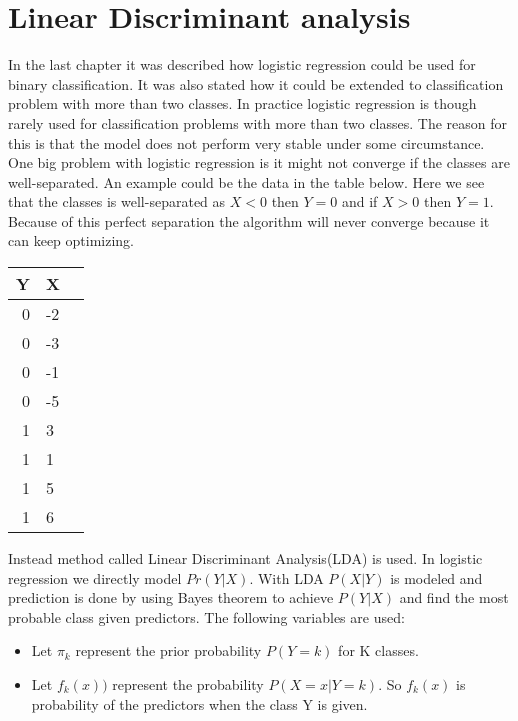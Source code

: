\chapter{Linear Discriminant analysis}
\label{chp:lindisana}

In the last chapter it was described how logistic regression could be used for binary classification. It was also stated how it could be extended to  classification problem with more than two classes. In practice logistic regression is though rarely used for classification problems with more than two classes. The reason for this is that the model does not perform very stable under some circumstance. One big problem with logistic regression is it might not converge if the classes are well-separated. An example could be the data in the table below. Here we see that the classes is well-separated as $X<0$ then $Y=0$ and if $X>0$ then $Y=1$. Because of this perfect separation the algorithm will never converge because it can keep optimizing.
\begin{center}
	\begin{tabular}{rll}
		\multicolumn{1}{c}{\textbf{Y}} &
		\multicolumn{1}{c}{\textbf{X}} \\ \hline
		0     &  -2  \\[0.05cm] 
		0     &  -3  \\[0.05cm] 
		0     &  -1  \\[0.05cm] 
		0     &  -5  \\[0.05cm] 
		1     &    3  \\[0.05cm] 
		1     &    1  \\[0.05cm] 
		1     &    5  \\[0.05cm] 
		1     &    6  \\[0.05cm] 
	\end{tabular}
\end{center}

Instead method called Linear Discriminant Analysis(LDA) is used. In logistic regression we directly model $Pr(Y|X)$. With LDA $P(X|Y)$ is modeled and prediction is done by using Bayes theorem to achieve $P(Y|X)$ and find the most probable class given predictors. The following variables are used:

\begin{itemize}
	\item Let $\pi_k$ represent the prior probability $P(Y=k)$ for K classes.
	\item Let $f_k(x))$ represent the probability $P(X=x|Y=k)$. So $f_k(x)$ is probability of the predictors when the class Y is given.
\end{itemize} 

